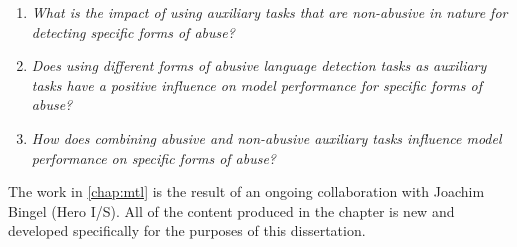 {\begin{center}
\begin{minipage}{0.9\textwidth}
\vspace{5mm}
    \begin{enumerate}[start=6, label={\textbf{RQ \arabic*}}]
        \item{\textit{What is the impact of using auxiliary tasks that are non-abusive in nature for detecting specific forms of abuse?}}
        \item{\textit{Does using different forms of abusive language detection tasks as auxiliary tasks have a positive influence on model performance for specific forms of abuse?}}
        \item{\textit{How does combining abusive and non-abusive auxiliary tasks influence model performance on specific forms of abuse?}}
    \end{enumerate}
    \vspace{5mm}
\end{minipage}
\end{center}

The work in \cref{chap:mtl} is the result of an ongoing collaboration with Joachim Bingel (Hero I/S).
All of the content produced in the chapter is new and developed specifically for the purposes of this dissertation.

}
